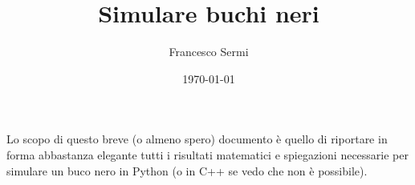 \documentclass[12pt, twoside, italian]{article}
\title{Simulare buchi neri}
\author{Francesco Sermi}
\date{\today}
\begin{document}




	\maketitle
	
	Lo scopo di questo breve (o almeno spero) documento è quello di riportare in forma abbastanza elegante tutti i risultati matematici e spiegazioni necessarie per simulare un buco nero in Python (o in C++ se vedo che non è possibile). 
	
\end{document}
